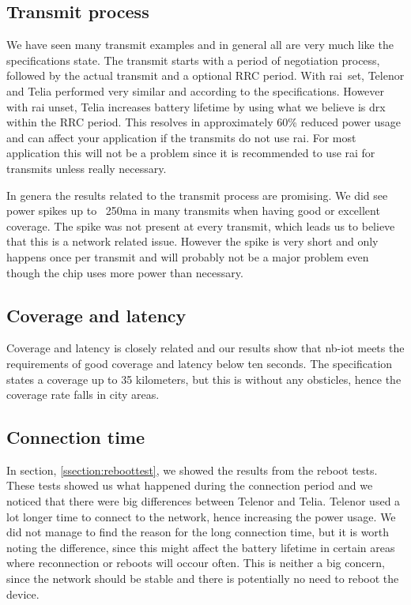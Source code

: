 \documentclass[USenglish]{ifimaster}  %
\begin{document}
\subsection{Transmit process}
We have seen many transmit examples and in general all are very much like the specifications state. The transmit starts with a period of negotiation process, followed by the actual transmit and a optional RRC period. With \acrshort{rai} set, Telenor and Telia performed very similar and according to the specifications. However with \acrshort{rai} unset, Telia increases battery lifetime by using what we believe is \acrshort{drx} within the RRC period. This resolves in approximately 60\% reduced power usage and can affect your application if the transmits do not use \acrshort{rai}. For most application this will not be a problem since it is recommended to use \acrshort{rai} for transmits unless really necessary.

In genera the results related to the transmit process are promising. We did see power spikes up to ~250\acrshort{ma} in many transmits when having good or excellent coverage. The spike was not present at every transmit, which leads us to believe that this is a network related issue. However the spike is very short and only happens once per transmit and will probably not be a major problem even though the chip uses more power than necessary.

\subsection{Coverage and latency}
Coverage and latency is closely related and our results show that \acrshort{nb-iot} meets the requirements of good coverage and latency below ten seconds. The specification states a coverage up to 35 kilometers, but this is without any obsticles, hence the coverage rate falls in city areas.

\subsection{Connection time}
In section, \vref{ssection:reboottest}, we showed the results from the reboot tests. These tests showed us what happened during the connection period and we noticed that there were big differences between Telenor and Telia. Telenor used a lot longer time to connect to the network, hence increasing the power usage. We did not manage to find the reason for the long connection time, but it is worth noting the difference, since this might affect the battery lifetime in certain areas where reconnection or reboots will occour often. This is neither a big concern, since the network should be stable and there is potentially no need to reboot the device.
\end{document}
